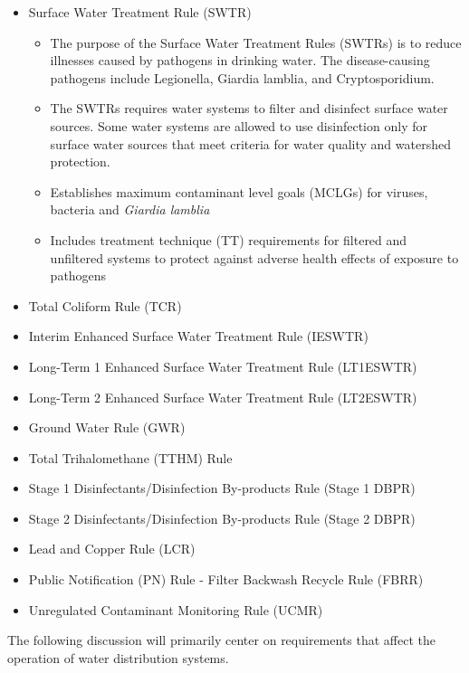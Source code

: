 \documentclass[10pt]{article}
\begin{document}
\begin{itemize}
  \item Surface Water Treatment Rule (SWTR)
  \begin{itemize}
\item The purpose of the Surface Water Treatment Rules (SWTRs) is to reduce illnesses caused by pathogens in drinking water. The disease-causing pathogens include Legionella, Giardia lamblia, and Cryptosporidium.

\item The SWTRs requires water systems to filter and disinfect surface water sources. Some water systems are allowed to use disinfection only for surface water sources that meet criteria for water quality and watershed protection.

\item Establishes maximum contaminant level goals (MCLGs) for viruses, bacteria and \textit{Giardia lamblia}

\item Includes treatment technique (TT) requirements for filtered and unfiltered systems to protect against adverse health effects of exposure to pathogens
\end{itemize}

  \item Total Coliform Rule (TCR)

  \item Interim Enhanced Surface Water Treatment Rule (IESWTR)

  \item Long-Term 1 Enhanced Surface Water Treatment Rule (LT1ESWTR)

  \item Long-Term 2 Enhanced Surface Water Treatment Rule (LT2ESWTR)

  \item Ground Water Rule (GWR)

  \item Total Trihalomethane (TTHM) Rule

  \item Stage 1 Disinfectants/Disinfection By-products Rule (Stage 1 DBPR)

  \item Stage 2 Disinfectants/Disinfection By-products Rule (Stage 2 DBPR)

  \item Lead and Copper Rule (LCR)

  \item Public Notification (PN) Rule - Filter Backwash Recycle Rule (FBRR)

  \item Unregulated Contaminant Monitoring Rule (UCMR)

\end{itemize}
The following discussion will primarily center on requirements that affect the operation of water distribution systems.
\end{document}
